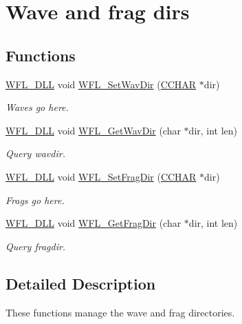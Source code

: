 \hypertarget{group__ccc}{\section{Wave and frag dirs}
\label{group__ccc}
}
\subsection*{Functions}
\begin{DoxyCompactItemize}
\item 
\hyperlink{wflib_8h_a04f24f8cb8df37b828ec454107aeb686}{W\-F\-L\-\_\-\-D\-L\-L} void \hyperlink{group__ccc_ga7e6b81098fd88f9f3e9679db155833cd}{W\-F\-L\-\_\-\-Set\-Wav\-Dir} (\hyperlink{wflib_8h_a50a88b13633a8142e9172fb5124d729a}{C\-C\-H\-A\-R} $\ast$dir)
\begin{DoxyCompactList}\small\item\em Waves go here. \end{DoxyCompactList}\item 
\hyperlink{wflib_8h_a04f24f8cb8df37b828ec454107aeb686}{W\-F\-L\-\_\-\-D\-L\-L} void \hyperlink{group__ccc_ga5b605148cb65b914c4a570f4a3e172e1}{W\-F\-L\-\_\-\-Get\-Wav\-Dir} (char $\ast$dir, int len)
\begin{DoxyCompactList}\small\item\em Query wavdir. \end{DoxyCompactList}\item 
\hyperlink{wflib_8h_a04f24f8cb8df37b828ec454107aeb686}{W\-F\-L\-\_\-\-D\-L\-L} void \hyperlink{group__ccc_ga5a83f22068683ab00b40ff331ba1a75f}{W\-F\-L\-\_\-\-Set\-Frag\-Dir} (\hyperlink{wflib_8h_a50a88b13633a8142e9172fb5124d729a}{C\-C\-H\-A\-R} $\ast$dir)
\begin{DoxyCompactList}\small\item\em Frags go here. \end{DoxyCompactList}\item 
\hyperlink{wflib_8h_a04f24f8cb8df37b828ec454107aeb686}{W\-F\-L\-\_\-\-D\-L\-L} void \hyperlink{group__ccc_gad4363f2c411203e50c8aa296a795855e}{W\-F\-L\-\_\-\-Get\-Frag\-Dir} (char $\ast$dir, int len)
\begin{DoxyCompactList}\small\item\em Query fragdir. \end{DoxyCompactList}\end{DoxyCompactItemize}


\subsection{Detailed Description}
These functions manage the wave and frag directories. 

